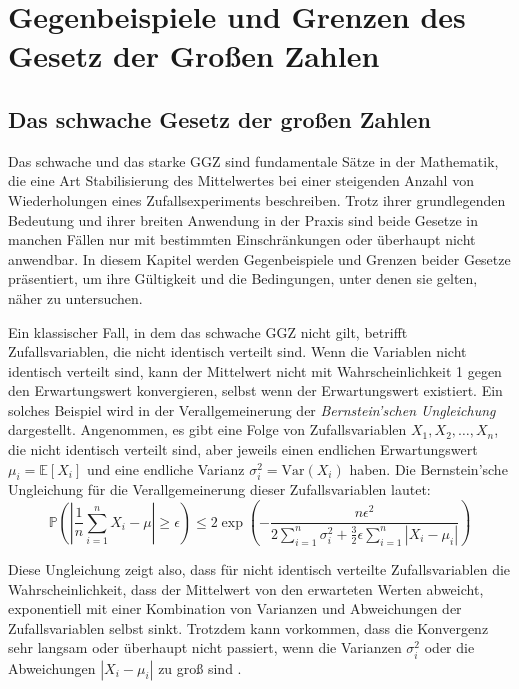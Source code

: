 \documentclass[aodsor,preprint]{imsart}
\numberwithin{equation}{section}
\theoremstyle{plain}
\begin{document}
\section{Gegenbeispiele und Grenzen des Gesetz der Großen Zahlen}
\label{sec:grenzen}


\subsection{Das schwache Gesetz der großen Zahlen}


Das schwache und das starke GGZ sind fundamentale Sätze in der Mathematik, die eine Art Stabilisierung des Mittelwertes bei einer steigenden Anzahl von Wiederholungen eines Zufallsexperiments beschreiben.
Trotz ihrer grundlegenden Bedeutung und ihrer breiten Anwendung in der Praxis sind beide Gesetze in manchen Fällen nur mit bestimmten Einschränkungen oder überhaupt nicht anwendbar.
In diesem Kapitel werden Gegenbeispiele und Grenzen beider Gesetze präsentiert, um ihre Gültigkeit und die Bedingungen, unter denen sie gelten, näher zu untersuchen.


Ein klassischer Fall, in dem das schwache GGZ nicht gilt, betrifft Zufallsvariablen, die nicht identisch verteilt sind.
Wenn die Variablen nicht identisch verteilt sind, kann der Mittelwert nicht mit Wahrscheinlichkeit 1 gegen den Erwartungswert konvergieren, selbst wenn der Erwartungswert existiert.
Ein solches Beispiel wird in der Verallgemeinerung der \textit{Bernstein'schen Ungleichung} dargestellt.
Angenommen, es gibt eine Folge von Zufallsvariablen \(X_1, X_2, \dots, X_n\), die nicht identisch verteilt sind, aber jeweils einen endlichen Erwartungswert \(\mu_i = \mathbb{E}[X_i]\) und eine endliche Varianz \(\sigma_i^2 = \text{Var}(X_i)\) haben. Die Bernstein'sche Ungleichung für die Verallgemeinerung dieser Zufallsvariablen lautet:
\[
\mathbb{P}\left( \left|\frac{1}{n} \sum_{i=1}^n X_i - \mu \right| \geq \epsilon \right) \leq 2 \exp \left( -\frac{n \epsilon^2}{2 \sum_{i=1}^n \sigma_i^2 + \frac{3}{2} \epsilon \sum_{i=1}^n |X_i - \mu_i|} \right)
\]

Diese Ungleichung zeigt also, dass für nicht identisch verteilte Zufallsvariablen die Wahrscheinlichkeit, dass der Mittelwert von den erwarteten Werten abweicht, exponentiell mit einer Kombination von Varianzen und Abweichungen der Zufallsvariablen selbst sinkt.
Trotzdem kann vorkommen, dass die Konvergenz sehr langsam oder überhaupt nicht passiert, wenn die Varianzen \(\sigma_i^2\) oder die Abweichungen \(|X_i - \mu_i|\) zu groß sind \citep{stoyanov2013}.
\end{document}
